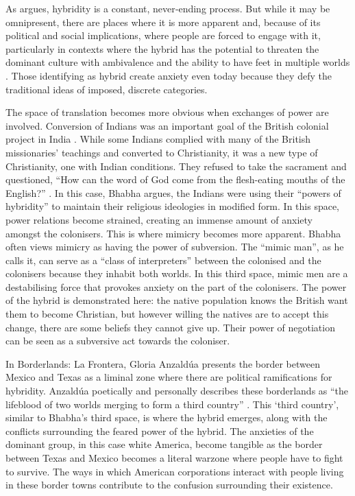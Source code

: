 	
	As  \textcite[52]{Bhabha_1994} 
	 argues, hybridity is a constant, never‐ending process. But while it may be omnipresent, there are places where it is more apparent and, because of its political and social implications, where people are forced to engage with it, particularly in contexts where the hybrid has the potential to threaten the dominant culture with ambivalence and the ability to have feet in multiple worlds \parencite[77]{Anzaldua_1987}. Those identifying as hybrid create anxiety even today because they defy the traditional ideas of imposed, discrete categories. 
	 
	The space of translation becomes more obvious when exchanges of power are involved. Conversion of Indians was an important goal of the British colonial project in India \parencite{Bhabha_1994}. While some Indians complied with many of the British missionaries’ teachings and converted to Christianity, it was a new type of Christianity, one with Indian conditions. They refused to take the sacrament and questioned, “How can the word of God come from the flesh-eating mouths of the English?” \parencite[166]{Bhabha_1994}. In this case, Bhabha argues, the Indians were using their “powers of hybridity” \parencite[167]{Bhabha_1994} to maintain their religious ideologies in modified form. In this space, power relations become strained, creating an immense amount of anxiety amongst the colonisers. This is where mimicry becomes more apparent. Bhabha often views mimicry as having the power of subversion. The “mimic man”, as he calls it, can serve as a “class of interpreters” \parencite[124]{Bhabha_1994} between the colonised and the colonisers because they inhabit both worlds. In this third space, mimic men are a destabilising force that provokes anxiety on the part of the colonisers. The power of the hybrid is demonstrated here: the native population knows the British want them to become Christian, but however willing the natives are to accept this change, there are some beliefs they cannot give up. Their power of negotiation can be seen as a subversive act towards the coloniser. 
	
	In Borderlands: La Frontera, Gloria Anzaldúa presents the border between Mexico and Texas as a liminal zone where there are political ramifications for hybridity. Anzaldúa poetically and personally describes these borderlands as “the lifeblood of two worlds merging to form a third country” \parencite[3]{Anzaldua_1987}. This ‘third country’, similar to Bhabha’s third space, is where the hybrid emerges, along with the conflicts surrounding the feared power of the hybrid. The anxieties of the dominant group, in this case white America, become tangible as the border between Texas and Mexico becomes a literal warzone \parencite[11]{Anzaldua_1987}where people have to fight to survive. The ways in which American corporations interact with people living in these border towns contribute to the confusion surrounding their existence. 
	
